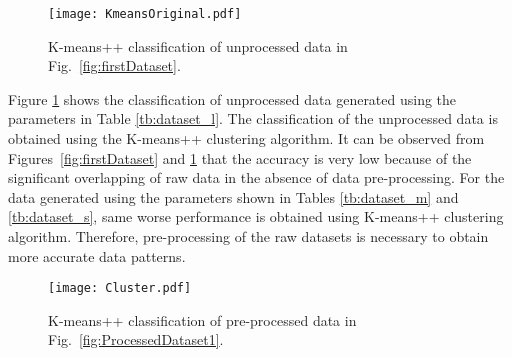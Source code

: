 \documentclass[letterpaper, 10 pt, conference]{ieeeconf}
\begin{document}


\begin{figure}[h!]
\centering
\captionsetup{justification=centering}
\label{fig:kmeansUnprocessed}
\texttt{[image: KmeansOriginal.pdf]}
\caption{K-means++ classification of unprocessed data in Fig.~\ref{fig:firstDataset}.}
\label{fig:KmeansUnprocessedData}
\end{figure}

Figure \ref{fig:KmeansUnprocessedData} shows the classification of unprocessed data generated using the parameters in Table \ref{tb:dataset_l}. The classification of the unprocessed data is obtained using the K-means++ clustering algorithm. It can be observed from Figures~\ref{fig:firstDataset} and \ref{fig:KmeansUnprocessedData} that the accuracy is very low because of the significant overlapping of raw data in the absence of data pre-processing. For the data generated using the parameters shown in Tables \ref{tb:dataset_m} and \ref{tb:dataset_s}, same worse performance is obtained using K-means++ clustering algorithm. Therefore, pre-processing of the raw datasets is necessary to obtain more accurate data patterns. 
\begin{figure}[h!]
\centering
\captionsetup{justification=centering}
\texttt{[image: Cluster.pdf]}
\caption{K-means++ classification of pre-processed data in Fig.~\ref{fig:ProcessedDataset1}.}
\label{fig:kmeansProcessed1}
\end{figure}
\end{document}
